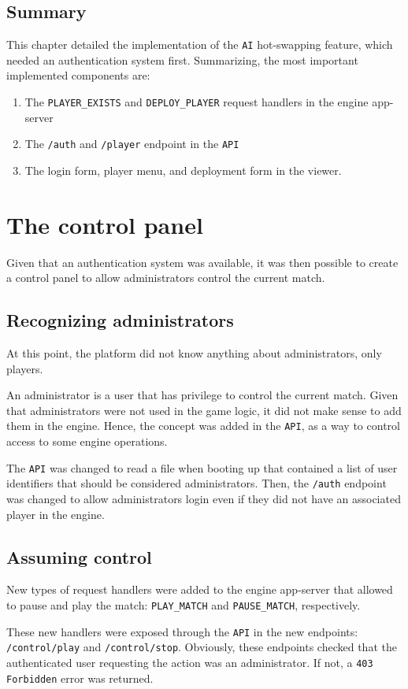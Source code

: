 \documentclass[a4paper,11pt,titlepage,abstract,numbers=noenddot,automark,mnsy,intlimits,rgb,dvipsnames]{report}
\begin{document}
\section{Summary}
This chapter detailed the implementation of the \texttt{AI} hot-swapping feature, which needed an
authentication system first. Summarizing, the most important implemented components are:
\begin{enumerate}
\item
The \texttt{PLAYER\_EXISTS} and \texttt{DEPLOY\_PLAYER} request handlers in the engine app-server
\item
The \texttt{/auth} and \texttt{/player} endpoint in the \texttt{API}
\item
The login form, player menu, and deployment form in the viewer.
\end{enumerate}
\chapter{The control panel}
\label{control_panel}
Given that an authentication system was available, it was then possible to create a control panel
to allow administrators control the current match.
\section{Recognizing administrators}
At this point, the platform did not know anything about administrators, only players.

An administrator is a user that has privilege to control the current match. Given that administrators were not used
in the game logic, it did not make sense to add them in the engine. Hence, the concept was added in the \texttt{API}, as a way
to control access to some engine operations.

The \texttt{API} was changed to read a file when booting up that contained a list of user identifiers that should be considered
administrators. Then, the \texttt{/auth} endpoint was changed to allow administrators login even if they did not have an associated
player in the engine.
\section{Assuming control}
New types of request handlers were added to the engine app-server that allowed to pause and play the match: \texttt{PLAY\_MATCH} and
\texttt{PAUSE\_MATCH}, respectively.

These new handlers were exposed through the \texttt{API} in the new endpoints: \texttt{/control/play} and \texttt{/control/stop}. Obviously,
these endpoints checked that the authenticated user requesting the action was an administrator. If not, a \texttt{403 Forbidden}
error was returned.
\end{document}
